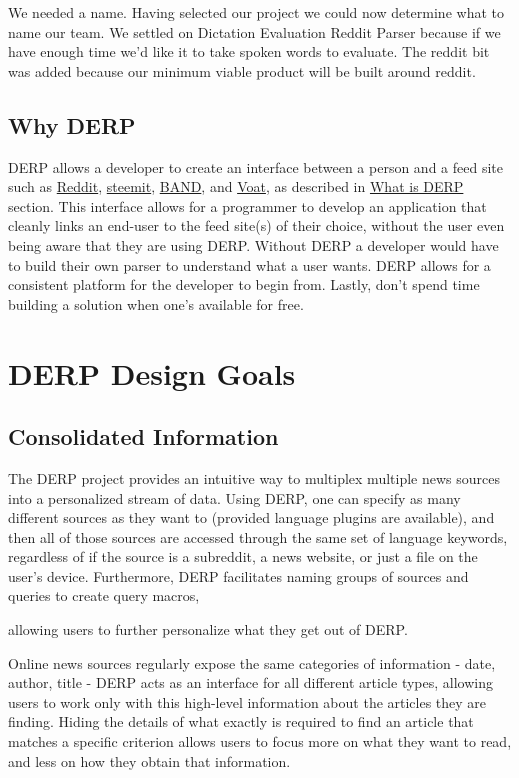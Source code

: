 \documentclass{article}
\begin{document}
We needed a name. Having selected our project we could now determine what to name our team. We settled on Dictation Evaluation Reddit Parser because if we have enough time we'd like it to take spoken words to evaluate. The reddit bit was added because our minimum viable product will be built around reddit.


\subsection{Why DERP}
DERP allows a developer to create an interface between a person and a feed site such as \href{https://www.reddit.com}{Reddit}, \href{https://steemit.com/}{steemit}, \href{https://band.us/home}{BAND}, and \href{https://voat.co/}{Voat}, as described in \hyperref[sec:whatisDERP]{What is DERP} section. This interface allows for a programmer to develop an application that cleanly links an end-user to the feed site(s) of their choice, without the user even being aware that they are using DERP. Without DERP a developer would have to build their own parser to understand what a user wants. DERP allows for a consistent platform for the developer to begin from. Lastly, don't spend time building a solution when one's available for free.


\newpage
\section{DERP Design Goals}
\subsection{Consolidated Information}
The DERP project provides an intuitive way to multiplex multiple news sources into a personalized stream of data. Using DERP, one can specify as many different sources as they want to (provided language plugins are available), and then all of those sources are accessed through the same set of language keywords, regardless of if the source is a subreddit, a news website, or just a file on the user's device. Furthermore, DERP facilitates naming groups of sources and queries to create query macros,
\begin{comment}
@ADS Did we actually decide on if we want savable sets of instructions other than in the form of a DERP program? (Can a program create another program?)
\end{comment}
allowing users to further personalize what they get out of DERP.

Online news sources regularly expose the same categories of information - date, author, title - DERP acts as an interface for all different article types, allowing users to work only with this high-level information about the articles they are finding. Hiding the details of what exactly is required to find an article that matches a specific criterion allows users to focus more on what they want to read, and less on how they obtain that information.
\end{document}
